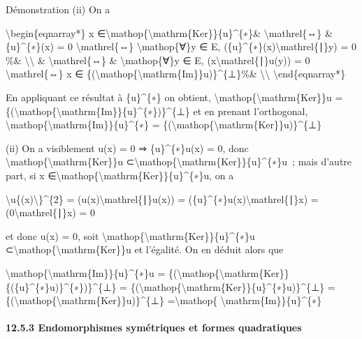 \documentclass[]{article}
\begin{document}
Démonstration (ii) On a

\textbackslash{}begin\{eqnarray*\} x
∈\textbackslash{}mathop\{\textbackslash{}mathrm\{Ker\}\}\{u\}\^{}\{∗\}\&
\textbackslash{}mathrel\{⇔\} \& \{u\}\^{}\{∗\}(x) = 0
\textbackslash{}mathrel\{⇔\} \textbackslash{}mathop\{∀\}y ∈ E,
(\{u\}\^{}\{∗\}(x)\textbackslash{}mathrel\{∣\}y) = 0 \%\&
\textbackslash{}\textbackslash{} \& \textbackslash{}mathrel\{⇔\} \&
\textbackslash{}mathop\{∀\}y ∈ E, (x\textbackslash{}mathrel\{∣\}u(y)) =
0 \textbackslash{}mathrel\{⇔\} x ∈
\{(\textbackslash{}mathop\{\textbackslash{}mathrm\{Im\}\}u)\}\^{}\{⊥\}\%\&
\textbackslash{}\textbackslash{} \textbackslash{}end\{eqnarray*\}

En appliquant ce résultat à \{u\}\^{}\{∗\} on obtient,
\textbackslash{}mathop\{\textbackslash{}mathrm\{Ker\}\}u =
\{(\textbackslash{}mathop\{\textbackslash{}mathrm\{Im\}\}\{u\}\^{}\{∗\})\}\^{}\{⊥\}
et en prenant l'orthogonal,
\textbackslash{}mathop\{\textbackslash{}mathrm\{Im\}\}\{u\}\^{}\{∗\} =
\{(\textbackslash{}mathop\{\textbackslash{}mathrm\{Ker\}\}u)\}\^{}\{⊥\}

(ii) On a visiblement u(x) = 0 ⇒ \{u\}\^{}\{∗\}u(x) = 0, donc
\textbackslash{}mathop\{\textbackslash{}mathrm\{Ker\}\}u
⊂\textbackslash{}mathop\{\textbackslash{}mathrm\{Ker\}\}\{u\}\^{}\{∗\}u~;
mais d'autre part, si x
∈\textbackslash{}mathop\{\textbackslash{}mathrm\{Ker\}\}\{u\}\^{}\{∗\}u,
on a

\textbackslash{}\textbar{}u\{(x)\textbackslash{}\textbar{}\}\^{}\{2\} =
(u(x)\textbackslash{}mathrel\{∣\}u(x)) =
(\{u\}\^{}\{∗\}u(x)\textbackslash{}mathrel\{∣\}x) =
(0\textbackslash{}mathrel\{∣\}x) = 0

et donc u(x) = 0, soit
\textbackslash{}mathop\{\textbackslash{}mathrm\{Ker\}\}\{u\}\^{}\{∗\}u
⊂\textbackslash{}mathop\{\textbackslash{}mathrm\{Ker\}\}u et l'égalité.
On en déduit alors que

\textbackslash{}mathop\{\textbackslash{}mathrm\{Im\}\}\{u\}\^{}\{∗\}u =
\{(\textbackslash{}mathop\{\textbackslash{}mathrm\{Ker\}\}\{(\{u\}\^{}\{∗\}u)\}\^{}\{∗\})\}\^{}\{⊥\}
=
\{(\textbackslash{}mathop\{\textbackslash{}mathrm\{Ker\}\}\{u\}\^{}\{∗\}u)\}\^{}\{⊥\}
=
\{(\textbackslash{}mathop\{\textbackslash{}mathrm\{Ker\}\}u)\}\^{}\{⊥\}
=\textbackslash{}mathop\{ \textbackslash{}mathrm\{Im\}\}\{u\}\^{}\{∗\}

\paragraph{12.5.3 Endomorphismes symétriques et formes quadratiques}
\end{document}
